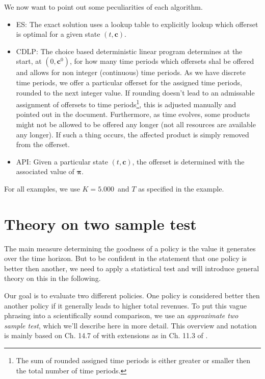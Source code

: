 We now want to point out some peculiarities of each algorithm.

\begin{itemize}
	\item ES: The exact solution uses a lookup table to explicitly lookup which offerset is optimal for a given state $(t, \boldsymbol{c})$.
	\item CDLP: The choice based deterministic linear program determines at the start, \ie at  $(0, \boldsymbol{c}^0)$, for how many time periods which offersets shal be offered and allows for non integer (continuous) time periods. As we have discrete time periods, we offer a particular offerset for the assigned time periods, rounded to the next integer value. If rounding doesn't lead to an admissable assignment of offersets to time periods\footnote{The sum of rounded assigned time periods is either greater or smaller then the total number of time periods.}, this is adjusted manually and pointed out in the document. Furthermore, as time evolves, some products might not be allowed to be offered any longer (not all resources are available any longer). If such a thing occurs, the affected product is simply removed from the offerset.
	\item API: Given a particular state $(t, \boldsymbol{c})$, the offerset is determined with the associated value of $\boldsymbol{\pi}$.
\end{itemize}

For all examples, we use $K = 5.000$\ and $T$ as specified in the example.

\section{Theory on two sample test}\label{s:TheoryTtest}

The main measure determining the goodness of a policy is the value it generates over the time horizon. But to be confident in the statement that one policy is better then another, we need to apply a statistical test and will introduce general theory on this in the following.

Our goal is to evaluate two different policies. One policy is considered better then another policy if it generally leads to higher total revenues. To put this vague phrasing into a scientifically sound comparison, we use an \emph{approximate two sample test}, which we'll describe here in more detail. This overview and notation is mainly based on Ch. 14.7 of \cite{Bamberg.2011} with extensions as in Ch. 11.3 of \cite{Fahrmeir.2007}.


